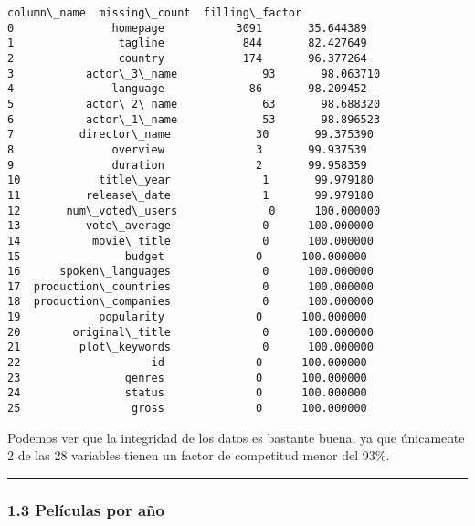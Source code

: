             \begin{tcolorbox}[breakable, size=fbox, boxrule=.5pt, pad at break*=1mm, opacityfill=0]
\begin{Verbatim}[commandchars=\\\{\}]
             column\_name  missing\_count  filling\_factor
0               homepage           3091       35.644389
1                tagline            844       82.427649
2                country            174       96.377264
3           actor\_3\_name             93       98.063710
4               language             86       98.209452
5           actor\_2\_name             63       98.688320
6           actor\_1\_name             53       98.896523
7          director\_name             30       99.375390
8               overview              3       99.937539
9               duration              2       99.958359
10            title\_year              1       99.979180
11          release\_date              1       99.979180
12       num\_voted\_users              0      100.000000
13          vote\_average              0      100.000000
14           movie\_title              0      100.000000
15                budget              0      100.000000
16      spoken\_languages              0      100.000000
17  production\_countries              0      100.000000
18  production\_companies              0      100.000000
19            popularity              0      100.000000
20        original\_title              0      100.000000
21         plot\_keywords              0      100.000000
22                    id              0      100.000000
23                genres              0      100.000000
24                status              0      100.000000
25                 gross              0      100.000000
\end{Verbatim}
\end{tcolorbox}
        
    Podemos ver que la integridad de los datos es bastante buena, ya que
únicamente 2 de las 28 variables tienen un factor de competitud menor
del 93\%.

    \begin{center}\rule{0.5\linewidth}{0.5pt}\end{center}

\hypertarget{peluxedculas-por-auxf1o}{%
\subsubsection{1.3 Películas por año}\label{peluxedculas-por-auxf1o}}

